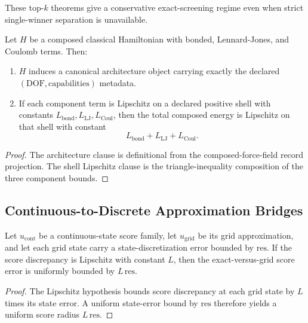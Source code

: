 These top-$k$ theorems give a conservative exact-screening regime even when strict single-winner separation is unavailable.

\begin{theorem}\label{thm:composed-classical-forcefield-interface}
Let $H$ be a composed classical Hamiltonian with bonded, Lennard-Jones, and Coulomb terms. Then:
\begin{enumerate}
\item $H$ induces a canonical architecture object carrying exactly the declared $(\mathrm{DOF},\mathrm{capabilities})$ metadata.
\item If each component term is Lipschitz on a declared positive shell with constants $L_{\mathrm{bond}},L_{\mathrm{LJ}},L_{\mathrm{Coul}}$, then the total composed energy is Lipschitz on that shell with constant
\[
L_{\mathrm{bond}}+L_{\mathrm{LJ}}+L_{\mathrm{Coul}}.
\]
\end{enumerate}
\end{theorem}

\begin{proof}
The architecture clause is definitional from the composed-force-field record projection. The shell Lipschitz clause is the triangle-inequality composition of the three component bounds.
\end{proof}

\subsection{Continuous-to-Discrete Approximation Bridges}

\begin{theorem}\label{thm:lipschitz-grid-approx}
Let $u_{\mathrm{cont}}$ be a continuous-state score family, let $u_{\mathrm{grid}}$ be its grid approximation, and let each grid state carry a state-discretization error bounded by $\mathrm{res}$. If the score discrepancy is Lipschitz with constant $L$, then the exact-versus-grid score error is uniformly bounded by $L\,\mathrm{res}$.
\end{theorem}

\begin{proof}
The Lipschitz hypothesis bounds score discrepancy at each grid state by $L$ times its state error. A uniform state-error bound by $\mathrm{res}$ therefore yields a uniform score radius $L\,\mathrm{res}$.
\end{proof}

